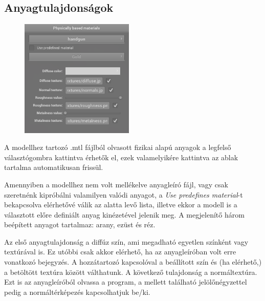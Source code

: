 \subsection{Anyagtulajdonságok}

\begin{figure}
    \vspace{-23pt}
    \includegraphics[width=0.48\textwidth]{images/pbr_materials.png}
    \vspace{-20pt}
\end{figure}

A modellhez tartozó .mtl fájlból olvasott fizikai alapú anyagok a legfelső választógombra kattintva érhetők el, ezek valamelyikére kattintva az ablak tartalma automatikusan frissül.

Amennyiben a modellhez nem volt mellékelve anyagleíró fájl, vagy csak szeretnénk kipróbálni valamilyen valódi anyagot, a \textit{Use predefines material}-t bekapcsolva elérhetővé válik az alatta levő lista, illetve ekkor a modell is a választott előre definiált anyag kinézetével jelenik meg. A megjelenítő három beépített anyagot tartalmaz: arany, ezüst és réz.

Az első anyagtulajdonság a diffúz szín, ami megadható egyetlen színként vagy textúrával is. Ez utóbbi csak akkor elérhető, ha az anyagleíróban volt erre vonatkozó bejegyzés. A hozzátartozó kapcsolóval a beállított szín és (ha elérhető,) a betöltött textúra között válthatunk. A következő tulajdonság a normáltextúra. Ezt is az anyagleíróból olvassa a program, a mellett található jelölőnégyzettel pedig a normáltérképezés kapcsolhatjuk be/ki.

